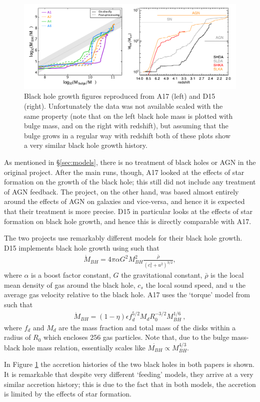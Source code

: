 \begin{figure}[!h]
  \includegraphics[width=\textwidth]{figures/comparisonfig.pdf}
    \caption{Black hole growth figures reproduced from A17 (left) and D15 (right).
    Unfortunately the data was not available scaled with the same property
    (note that on the left black hole mass is plotted with bulge mass, and on
    the right with redshift), but assuming that the bulge grows in a regular
    way with redshift both of these plots show a very similar black hole growth
    history.}
  \label{fig:bhhistory}
\end{figure}
As mentioned in §\ref{sec:models}, there is no treatment of black holes or AGN
in the original \fire{} project. After the main runs, though, A17 looked at the
effects of star formation on the growth of the black hole; this still did
not include any treatment of AGN feedback. The \hagn{} project, on the other
hand, was based almost entirely around the effects of AGN on galaxies and
vice-versa, and hence it is expected that their treatment is more precise.
D15 in particular looks at the effects of star formation on black hole growth,
and hence this is directly comparable with A17.

The two projects use remarkably different models for their black hole growth.
D15 implements black hole growth using \citet{bondi_spherically_1952} such
that
\begin{align}
  \dot{M}_{BH} = 4\pi \alpha G^2 M_{BH}^2
                 \frac{\bar{\rho}}{(c_s^2 + u^2)^{3/2}},
  \label{eqn:d15:mdot}
\end{align}
where $\alpha$ is a boost factor constant, $G$ the gravitational constant,
$\bar{\rho}$ is the local mean density of gas around the black hole, $c_s$ the
local sound speed, and $u$ the average gas velocity relative to the black hole.
A17 uses the `torque' model from \citet{hopkins_analytic_2011} such that
\begin{align}
  \dot{M}_{BH} = (1 - \eta) \epsilon f_d^{5/2} M_d R_0^{-3/2} M_{BH}^{1/6}~,
  \label{eqn:a17:mdot}
\end{align}
where $f_d$ and $M_d$ are the mass fraction and total mass of the disks within
a radius of $R_0$ which encloses 256 gas particles.
Note that, due to the bulge mass-black hole mass relation,
\citep{haring_black_2004} essentially scales like
$\dot{M_{BH}} \propto M_{BH}^{4/3}$.

In Figure \ref{fig:bhhistory} the accretion histories of the two black holes
in both papers is shown. It is remarkable that despite very different
`feeding' models, they arrive at a very similar accretion history; this is due
to the fact that in both models, the accretion is limited by the effects
of star formation.

